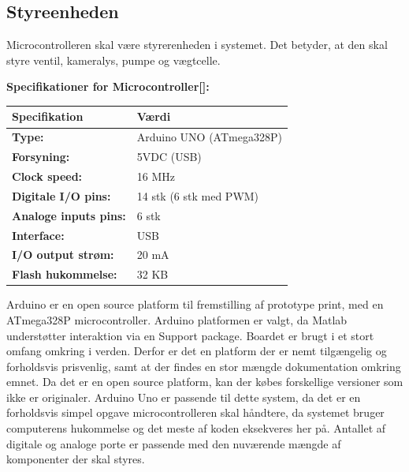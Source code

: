 

 
\newpage
\subsection{Styreenheden}
Microcontrolleren skal være styrerenheden i systemet. Det betyder, at den skal styre ventil, kameralys, pumpe og vægtcelle.  

\textbf{Specifikationer for Microcontroller[\citet{DH3}]:} 
\begin{center}
		\begin{longtable}{ | m{6.5cm} | m{6.5cm}| } 
			\hline
			\textbf{Specifikation} &\textbf{Værdi} \\ 
			\hline
			\textbf{Type:} & Arduino UNO (ATmega328P) \\ 
			\hline
			\textbf{Forsyning:} & 5VDC (USB)  \\ 
			\hline
			\textbf{Clock speed:} & 16 MHz  \\ 
			\hline		
			\textbf{Digitale I/O pins:} & 14 stk (6 stk med PWM)  \\ 
			\hline	
			\textbf{Analoge inputs pins:} & 6 stk  \\ 
			\hline	
			\textbf{Interface:} & USB  \\ 
			\hline	
			\textbf{I/O output strøm:} & 20 mA  \\ 
			\hline
			\textbf{Flash hukommelse:} & 32 KB  \\ 
			\hline	
		\end{longtable}
\end{center}
Arduino er en open source platform til fremstilling af prototype print, med en ATmega328P microcontroller. Arduino platformen er valgt, da Matlab understøtter interaktion via en Support package. Boardet er brugt i et stort omfang omkring i verden. Derfor er det en platform der er nemt tilgængelig og forholdsvis prisvenlig, samt at der findes en stor mængde dokumentation omkring emnet. Da det er en open source platform, kan der købes forskellige versioner som ikke er originaler. Arduino Uno er passende til dette system, da det er en forholdsvis simpel opgave microcontrolleren skal håndtere, da systemet bruger computerens hukommelse og det meste af koden eksekveres her på. Antallet af digitale og analoge porte er passende med den nuværende mængde af komponenter der skal styres. 

